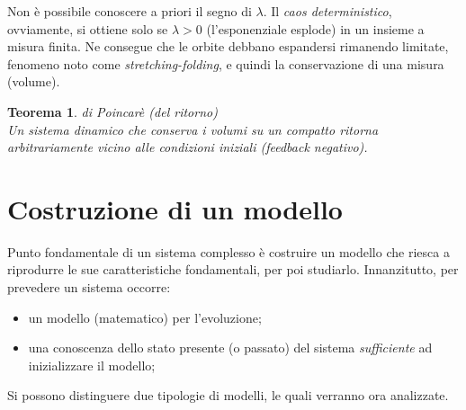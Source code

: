 \documentclass[12pt, a4paper]{book}
\theoremstyle{theorem}
\newtheorem{theorem}{Teorema}[section]
\begin{document}
			Non è possibile conoscere a priori il segno di $\lambda$.
			Il \emph{caos deterministico}, ovviamente, si ottiene solo se $\lambda>0$ (l'esponenziale esplode) in un insieme a misura finita.
			Ne consegue che le orbite debbano espandersi rimanendo limitate, fenomeno noto come \emph{stretching-folding}, e quindi la conservazione di una misura (volume).
			\begin{theorem}
				di Poincarè (del ritorno)
				\\Un sistema dinamico che conserva i volumi su un compatto ritorna arbitrariamente vicino alle condizioni iniziali (feedback negativo).
				\label{theorem:poincare}
			\end{theorem}
		
		\section{Costruzione di un modello}
			Punto fondamentale di un sistema complesso è costruire un modello che riesca a riprodurre le sue caratteristiche fondamentali, per poi studiarlo.
			Innanzitutto, per prevedere un sistema occorre:
			\begin{itemize}
				\item un modello (matematico) per l'evoluzione;
				\item una conoscenza dello stato presente (o passato) del sistema \emph{sufficiente} ad inizializzare il modello;
			\end{itemize}
			Si possono distinguere due tipologie di modelli, le quali verranno ora analizzate.
\end{document}
